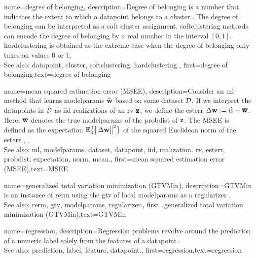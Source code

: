 {name={degree of belonging},
	description={Degree of belonging is a number that indicates the extent to which a \gls{datapoint} 
		belongs to a \gls{cluster} \cite[Ch. 8]{MLBasics}. The degree of belonging can be 
		interpreted as a soft \gls{cluster} assignment. \Gls{softclustering} methods can 
		encode the degree of belonging by a real number in the interval $[0,1]$. 
		\Gls{hardclustering} is obtained as the extreme case when the degree of belonging 
		only takes on values $0$ or $1$.
					\\ 
		See also: \gls{datapoint}, \gls{cluster}, \gls{softclustering}, \gls{hardclustering}.}, first={degree of belonging},text={degree of belonging} 
}

{name={mean squared estimation error (MSEE)},
	description={Consider an \gls{ml} method that 
		learns \gls{modelparams} $\widehat{{\bf w}}$ based on some \gls{dataset} $\mathcal{D}$. 
		If we interpret the \glspl{datapoint} in $\mathcal{D}$ as \gls{iid} \glspl{realization} of an \gls{rv} ${\bf z}$, 
		we define the \gls{esterr} $\Delta {\bf w} := \widehat{w} - \overline{{\bf w}}$. 
		Here, $\overline{{\bf w}}$ denotes the true \gls{modelparams} of the \gls{probdist} 
		of ${\bf z}$. The MSEE is 
		defined as the \gls{expectation} $\mathbb{E} \big\{ \big\| \Delta {\bf w} \big\|^{2} \big\}$ of the 
		squared Euclidean \gls{norm} of the \gls{esterr} \cite{LC}, \cite{kay}.
					\\ 
		See also: \gls{ml}, \gls{modelparams}, \gls{dataset}, \gls{datapoint}, \gls{iid}, \gls{realization}, \gls{rv}, \gls{esterr}, \gls{probdist}, \gls{expectation}, \gls{norm}, \gls{mean}.},
	first={mean squared estimation error (MSEE)},text={MSEE} 
}

{name={generalized total variation minimization (GTVMin)},
	description={GTVMin is an instance of \gls{rerm} 
		using the \gls{gtv} of local \gls{modelparams} as a \gls{regularizer} \cite{ClusteredFLTVMinTSP}.
					\\ 
		See also: \gls{rerm}, \gls{gtv}, \gls{modelparams}, \gls{regularizer}.},
	first={generalized total variation minimization (GTVMin)},text={GTVMin} 
}

{name={regression},
	description={Regression problems revolve around the 
		\gls{prediction} of a numeric \gls{label} solely from the \glspl{feature} of a \gls{datapoint} \cite[Ch. 2]{MLBasics}.
					\\ 
		See also: \gls{prediction}, \gls{label}, \gls{feature}, \gls{datapoint}.},
	first={regression},text={regression} 
}

